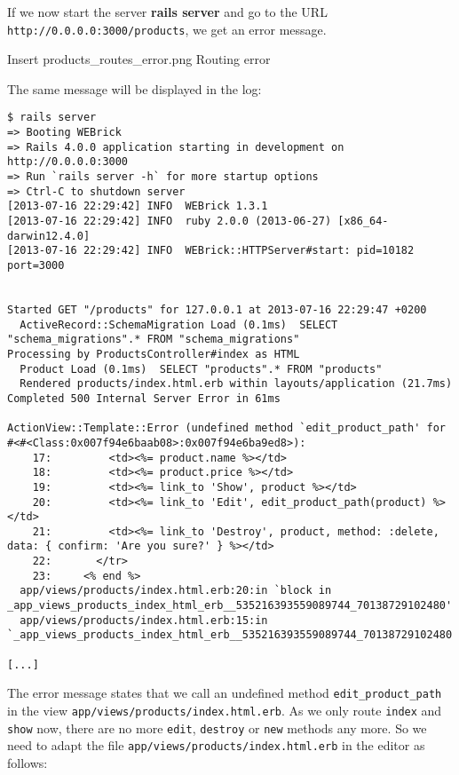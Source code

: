 \documentclass[a4paper]{book}
\begin{document}
If we now start the server \textbf{rails server} and go to the URL \texttt{http://0.0.0.0:3000/products}, we get an error message.

Insert products\_routes\_error.png Routing error

The same message will be displayed in the log:

\begin{shaded}\begin{verbatim}
$ rails server
=> Booting WEBrick
=> Rails 4.0.0 application starting in development on http://0.0.0.0:3000
=> Run `rails server -h` for more startup options
=> Ctrl-C to shutdown server
[2013-07-16 22:29:42] INFO  WEBrick 1.3.1
[2013-07-16 22:29:42] INFO  ruby 2.0.0 (2013-06-27) [x86_64-darwin12.4.0]
[2013-07-16 22:29:42] INFO  WEBrick::HTTPServer#start: pid=10182 port=3000


Started GET "/products" for 127.0.0.1 at 2013-07-16 22:29:47 +0200
  ActiveRecord::SchemaMigration Load (0.1ms)  SELECT "schema_migrations".* FROM "schema_migrations"
Processing by ProductsController#index as HTML
  Product Load (0.1ms)  SELECT "products".* FROM "products"
  Rendered products/index.html.erb within layouts/application (21.7ms)
Completed 500 Internal Server Error in 61ms

ActionView::Template::Error (undefined method `edit_product_path' for #<#<Class:0x007f94e6baab08>:0x007f94e6ba9ed8>):
    17:         <td><%= product.name %></td>
    18:         <td><%= product.price %></td>
    19:         <td><%= link_to 'Show', product %></td>
    20:         <td><%= link_to 'Edit', edit_product_path(product) %></td>
    21:         <td><%= link_to 'Destroy', product, method: :delete, data: { confirm: 'Are you sure?' } %></td>
    22:       </tr>
    23:     <% end %>
  app/views/products/index.html.erb:20:in `block in _app_views_products_index_html_erb__535216393559089744_70138729102480'
  app/views/products/index.html.erb:15:in `_app_views_products_index_html_erb__535216393559089744_70138729102480'

[...]
\end{verbatim}\end{shaded}

The error message states that we call an undefined method \texttt{edit\_product\_path} in the view \texttt{app/views/products/index.html.erb}. As we only route \texttt{index} and \texttt{show} now, there are no more \texttt{edit}, \texttt{destroy} or \texttt{new} methods any more. So we need to adapt the file \texttt{app/views/products/index.html.erb} in the editor as follows:
\end{document}
